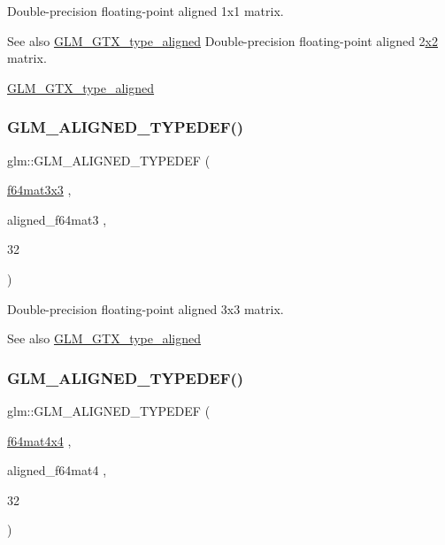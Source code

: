 Double-\/precision floating-\/point aligned 1x1 matrix. \begin{DoxySeeAlso}{See also}
\mbox{\hyperlink{group__gtx__type__aligned}{G\+L\+M\+\_\+\+G\+T\+X\+\_\+type\+\_\+aligned}} Double-\/precision floating-\/point aligned 2\mbox{\hyperlink{glad_8h_ad2cea6eadb01f017f0d57e7edf0ce988}{x2}} matrix. 

\mbox{\hyperlink{group__gtx__type__aligned}{G\+L\+M\+\_\+\+G\+T\+X\+\_\+type\+\_\+aligned}} 
\end{DoxySeeAlso}
\mbox{\label{group__gtx__type__aligned_gaae8e4639c991e64754145ab8e4c32083}} 
\subsubsection{\texorpdfstring{GLM\_ALIGNED\_TYPEDEF()}{GLM\_ALIGNED\_TYPEDEF()}\hspace{0.1cm}{\footnotesize\ttfamily [194/209]}}
{\footnotesize\ttfamily glm\+::\+G\+L\+M\+\_\+\+A\+L\+I\+G\+N\+E\+D\+\_\+\+T\+Y\+P\+E\+D\+EF (\begin{DoxyParamCaption}\item[{\mbox{\hyperlink{group__gtc__type__precision_gab272e67eb87cc1e8233237480c2aa8d2}{f64mat3x3}}}]{,  }\item[{aligned\+\_\+f64mat3}]{,  }\item[{32}]{ }\end{DoxyParamCaption})}

Double-\/precision floating-\/point aligned 3x3 matrix. \begin{DoxySeeAlso}{See also}
\mbox{\hyperlink{group__gtx__type__aligned}{G\+L\+M\+\_\+\+G\+T\+X\+\_\+type\+\_\+aligned}} 
\end{DoxySeeAlso}
\mbox{\label{group__gtx__type__aligned_ga6e9094f3feb3b5b49d0f83683a101fde}} 
\subsubsection{\texorpdfstring{GLM\_ALIGNED\_TYPEDEF()}{GLM\_ALIGNED\_TYPEDEF()}\hspace{0.1cm}{\footnotesize\ttfamily [195/209]}}
{\footnotesize\ttfamily glm\+::\+G\+L\+M\+\_\+\+A\+L\+I\+G\+N\+E\+D\+\_\+\+T\+Y\+P\+E\+D\+EF (\begin{DoxyParamCaption}\item[{\mbox{\hyperlink{group__gtc__type__precision_ga6b1ada50de2fc7d991138ab857fb2476}{f64mat4x4}}}]{,  }\item[{aligned\+\_\+f64mat4}]{,  }\item[{32}]{ }\end{DoxyParamCaption})}

